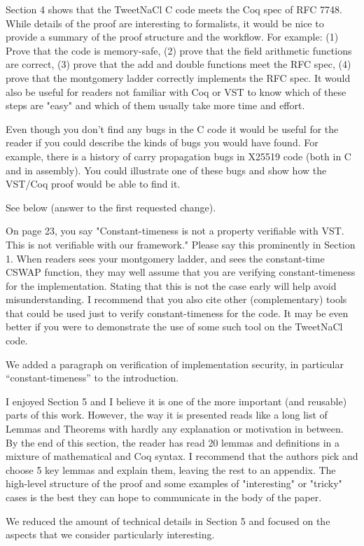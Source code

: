Section 4 shows that the TweetNaCl C code meets the Coq spec of RFC 7748. While details of the proof are interesting to formalists, it would be nice to provide a summary of the proof structure and the workflow. For example: (1) Prove that the code is memory-safe, (2) prove that the field arithmetic functions are correct, (3) prove that the add and double functions meet the RFC spec, (4) prove that the montgomery ladder correctly implements the RFC spec. It would also be useful for readers not familiar with Coq or VST to know which of these steps are "easy" and which of them usually take more time and effort.
\begin{answer}
\end{answer}

Even though you don't find any bugs in the C code it would be useful for the reader if you could describe the kinds of bugs you would have found. For example, there is a history of carry propagation bugs in X25519 code (both in C and in assembly). You could illustrate one of these bugs and show how the VST/Coq proof would be able to find it.
\begin{answer}
  See below (answer to the first requested change).
\end{answer}

On page 23, you say "Constant-timeness is not a property verifiable with VST. This is not verifiable with our framework." Please say this prominently in Section 1. When readers sees your montgomery ladder, and sees the constant-time CSWAP function, they may well assume that you are verifying constant-timeness for the implementation. Stating that this is not the case early will help avoid misunderstanding. I recommend that you also cite other (complementary) tools that could be used just to verify constant-timeness for the code. It may be even better if you were to demonstrate the use of some such tool on the TweetNaCl code.
\begin{answer}
  We added a paragraph on verification of implementation security, in particular ``constant-timeness'' to the introduction.
\end{answer}

I enjoyed Section 5 and I believe it is one of the more important (and reusable) parts of this work. However, the way it is presented reads like a long list of Lemmas and Theorems with hardly any explanation or motivation in between. By the end of this section, the reader has read 20 lemmas and definitions in a mixture of mathematical and Coq syntax. I recommend that the authors pick and choose 5 key lemmas and explain them, leaving the rest to an appendix. The high-level structure of the proof and some examples of "interesting" or "tricky" cases is the best they can hope to communicate in the body of the paper.
\begin{answer}
  We reduced the amount of technical details in Section 5 and focused on the aspects that we consider particularly interesting.
\end{answer}


